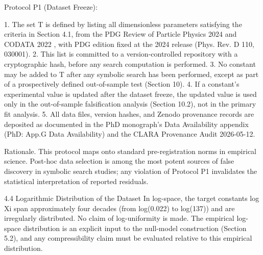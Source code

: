   Protocol P1 (Dataset Freeze):

  1. The set T is defined by listing all dimensionless parameters satisfying the criteria in
  Section 4.1, from the PDG Review of Particle Physics 2024 \citep{pdg2024} and CODATA 2022 \citep{codata2022}, with
  PDG edition fixed at the 2024 release (Phys. Rev. D 110, 030001).
  2. This list is committed to a version-controlled repository with a cryptographic hash,
  before any search computation is performed.
  3. No constant may be added to T after any symbolic search has been performed,
  except as part of a prospectively defined out-of-sample test (Section 10).
  4. If a constant's experimental value is updated after the dataset freeze, the updated
  value is used only in the out-of-sample falsification analysis (Section 10.2), not in the
  primary fit analysis.
  5. All data files, version hashes, and Zenodo provenance records are deposited as
  documented in the PhD monograph's Data Availability appendix (PhD: App.G Data
  Availability) and the CLARA Provenance Audit 2026-05-12.

  Rationale. This protocol maps onto standard pre-registration norms in empirical
  science. Post-hoc data selection is among the most potent sources of false discovery in
  symbolic search studies; any violation of Protocol P1 invalidates the statistical
  interpretation of reported residuals.

  4.4 Logarithmic Distribution of the Dataset
  In log-space, the target constants {log Xi} span approximately four decades (from
  log(0.022) to log(137)) and are irregularly distributed. No claim of log-uniformity is
  made. The empirical log-space distribution is an explicit input to the null-model
  construction (Section 5.2), and any compressibility claim must be evaluated relative to
  this empirical distribution.


